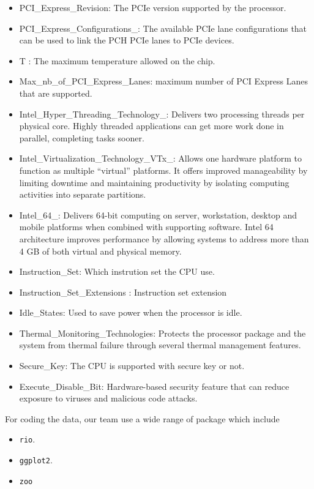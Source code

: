 \begin{itemize}
    \item PCI\_Express\_Revision: The PCIe version supported by the processor. 
    \item PCI\_Express\_Configurations\_: The available PCIe lane configurations that can be used to link the PCH PCIe lanes to PCIe devices.
    \item T : The maximum temperature allowed on the chip.
    \item Max\_nb\_of\_PCI\_Express\_Lanes: maximum number of PCI Express Lanes that are supported.
    \item Intel\_Hyper\_Threading\_Technology\_: Delivers two processing threads per physical core. Highly threaded applications can get more work done in parallel, completing tasks sooner.
    \item Intel\_Virtualization\_Technology\_VTx\_: Allows one hardware platform to function as multiple “virtual” platforms. It offers improved manageability by limiting downtime and maintaining productivity by isolating computing activities into separate partitions.
    \item Intel\_64\_: Delivers 64-bit computing on server, workstation, desktop and mobile platforms when combined with supporting software. Intel 64 architecture improves performance by allowing systems to address more than 4 GB of both virtual and physical memory.
    \item Instruction\_Set: Which instrution set the CPU use.
    \item Instruction\_Set\_Extensions :  Instruction set extension
    \item Idle\_States: Used to save power when the processor is idle.
    \item Thermal\_Monitoring\_Technologies: Protects the processor package and the system from thermal failure through several thermal management features.	
    \item Secure\_Key: The CPU is supported with secure key or not.
    \item Execute\_Disable\_Bit: Hardware-based security feature that can reduce exposure to viruses and malicious code attacks.
\end{itemize}

For coding the data, our team use a wide range of package which include 
\begin{itemize}
    \item \verb|rio|.
    \item \verb|ggplot2|.
    \item \verb|zoo|
\end{itemize}

